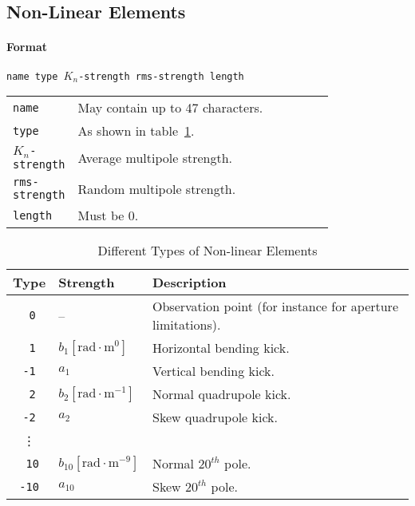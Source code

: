\subsection{Non-Linear Elements} \label{NonEle}

\paragraph{Format} \texttt{name type $K_{n}$-strength rms-strength length}

\bigskip
\begin{tabular}{@{}lp{0.8\linewidth}}
    \texttt{name} & May contain up to 47 characters. \\
    \texttt{type} & As shown in table~\ref{T-NonEle}. \\
    \texttt{$K_{n}$-strength} & Average multipole strength. \\
    \texttt{rms-strength} & Random multipole strength. \\
    \texttt{length} & Must be 0.
\end{tabular}

\begin{table}[h]
    \caption{Different Types of Non-linear Elements}
    \label{T-NonEle}
    \centering
    \renewcommand{\arraystretch}{1.5}
    \begin{tabular}{|c|l|l|}
        \hline
        \rowcolor{blue!30}
        \textbf{Type} & \textbf{Strength} & \textbf{Description} \\
        \hline
        \texttt{~0} & -- & Observation point (for instance for aperture limitations). \\
        \hline
        \texttt{~1} & $b_{1} [\mathrm{rad} \cdot \mathrm{m}^{0}]$ & Horizontal bending kick. \\
        \texttt{-1} & $a_{1}$ & Vertical bending kick. \\
        \hline
        \texttt{~2} & $b_{2} [\mathrm{rad} \cdot \mathrm{m}^{-1}]$ & Normal quadrupole kick. \\
        \texttt{-2} & $a_{2}$ & Skew quadrupole kick. \\
        \hline
        \vdots & & \\
        \hline
        \texttt{~10} & $b_{10} [\mathrm{rad} \cdot \mathrm{m}^{-9}]$ & Normal $20^{th}$ pole. \\
        \texttt{-10} & $a_{10}$ & Skew $20^{th}$ pole. \\
        \hline
    \end{tabular}
\end{table}

